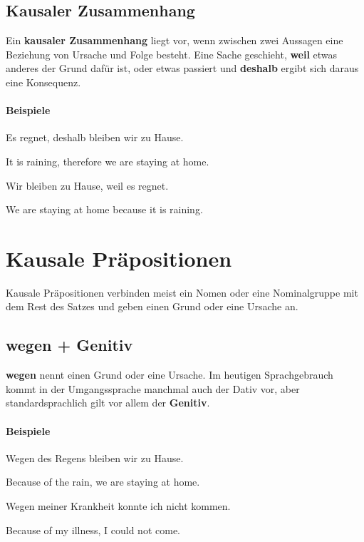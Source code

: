 \documentclass[a4paper]{article}
\newcommand{\EN}[1]{\par{\small\textcolor{TranslationGray}{#1}}\vspace{0.25em}}
\begin{document}
        \subsection{Kausaler Zusammenhang}
            Ein \textbf{kausaler Zusammenhang} liegt vor, wenn zwischen zwei Aussagen eine Beziehung von Ursache und Folge besteht. Eine Sache geschieht, \textbf{weil} etwas anderes der Grund dafür ist, oder etwas passiert und \textbf{deshalb} ergibt sich daraus eine Konsequenz.
            
            \paragraph{Beispiele}
                Es regnet, deshalb bleiben wir zu Hause.\\
                \EN{It is raining, therefore we are staying at home.}
                
                Wir bleiben zu Hause, weil es regnet.\\
                \EN{We are staying at home because it is raining.}
    
    
    \section{Kausale Präpositionen}
    Kausale Präpositionen verbinden meist ein Nomen oder eine Nominalgruppe mit dem Rest des Satzes und geben einen Grund oder eine Ursache an.
    
    \subsection{wegen + Genitiv}
        \textbf{wegen} nennt einen Grund oder eine Ursache. Im heutigen Sprachgebrauch kommt in der Umgangssprache manchmal auch der Dativ vor, aber standardsprachlich gilt vor allem der \textbf{Genitiv}.
        
        \paragraph{Beispiele}
            Wegen des Regens bleiben wir zu Hause.\\
            \EN{Because of the rain, we are staying at home.}
            
            Wegen meiner Krankheit konnte ich nicht kommen.\\
            \EN{Because of my illness, I could not come.}
            
\end{document}
